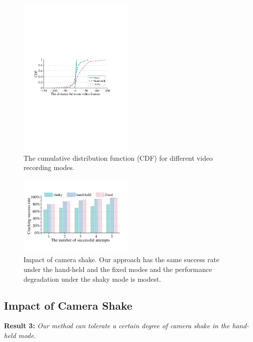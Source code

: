 \begin{figure}[t!]
    \centering
    \vspace{0.6cm}
    \includegraphics[width=0.5\textwidth]{fig/13.pdf}
    \caption{The cumulative distribution function (CDF) for different video recording modes.}
    \label{fig:fig13}
\end{figure}

\begin{figure}[!t]
    \centering
    \includegraphics[width=0.5\textwidth]{fig/14.pdf}
    \caption{Impact of camera shake. Our approach has the same success rate under the hand-held and the fixed modes and the performance degradation under the shaky mode is modest. }
    \label{fig:fig14}
\end{figure}


    \subsection{Impact of Camera Shake}

    \noindent \textbf{Result 3:} \emph{Our method can tolerate a certain degree of camera shake in the hand-held mode.}

